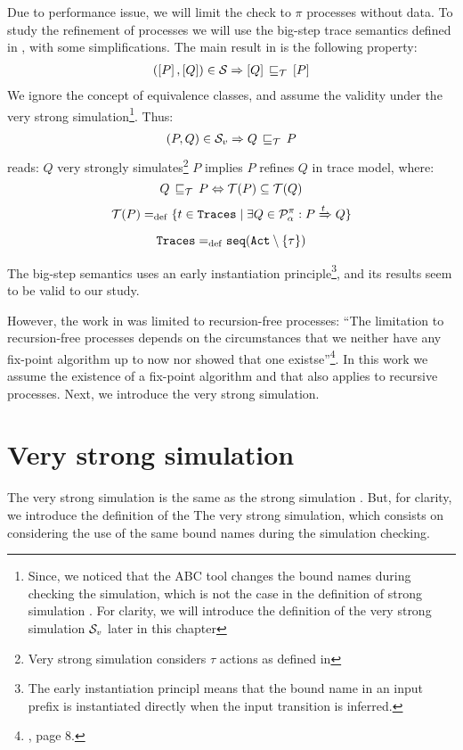 Due to performance issue, we will limit the check to $\pi$ processes without data. To study the refinement of \picalc{} processes we will use the big-step trace semantics defined in \cite{gieseking}, with some simplifications. 
The main result in \cite{gieseking} is the following property:
\begin{align}
    (\ec{P},\ec{Q})\in{}\simu \Rightarrow \ec{Q} \refi \ec{P} \label{property1}
\end{align}
We ignore the concept of equivalence classes, and assume the validity under the very strong simulation\footnote{Since, we noticed that the ABC tool changes the bound names during checking the simulation, which is not the case in the definition of strong simulation . For clarity, we will introduce the definition of the very strong simulation $\mathcal{S}_v$ later in this chapter}. Thus:
\begin{align}
    (P,Q)\in{}\simuv \Rightarrow Q \refi P
\label{property2}
\end{align}
 reads: $Q$ very strongly simulates\footnote{Very strong simulation considers $\tau$ actions as defined in } $P$ implies $P$ refines $Q$ in trace model, where:
\[Q\refi P \Leftrightarrow \Traces[P]\subseteq\Traces[Q]\]
\[\Traces[P] \define \{t\in \tr \mid \exists Q\in\procsApha: P \bigstep{t} Q\}\]
\[\tr \define \seqset{\actions\setminus\set{\tau}}\]

The big-step semantics uses an early instantiation principle\footnote{The early instantiation principl means that the bound name in an input prefix is instantiated directly when the input transition is inferred.}, and its results seem to be valid to our study.



However, the work in \cite{gieseking} was limited to recursion-free processes: ``The limitation to recursion-free processes depends on the circumstances that we neither have any fix-point algorithm up to now nor showed that one existse''\footnote{\cite{gieseking}, page $8$.}. In this work we assume the existence of a fix-point algorithm and that  also applies to recursive processes.
Next, we introduce the very strong simulation.
\section{Very strong simulation}
\label{sec_failure-refinement}
The very strong simulation is the same as the strong simulation . But, for clarity, we introduce the definition of the The very strong simulation, which consists on considering the use of the same bound names during the simulation checking.

